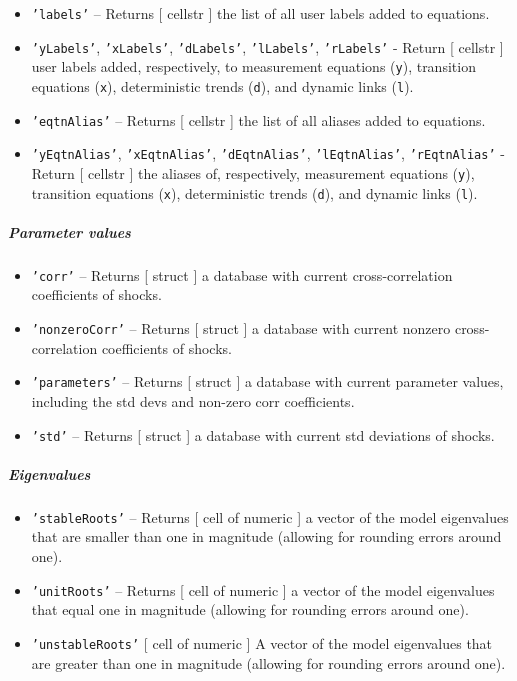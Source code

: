 \begin{itemize}
\item
  \texttt{'labels'} -- Returns {[} cellstr {]} the list of all user
  labels added to equations.
\item
  \texttt{'yLabels'}, \texttt{'xLabels'}, \texttt{'dLabels'},
  \texttt{'lLabels'}, \texttt{'rLabels'} - Return {[} cellstr {]} user
  labels added, respectively, to measurement equations (\texttt{y}),
  transition equations (\texttt{x}), deterministic trends (\texttt{d}),
  and dynamic links (\texttt{l}).
\item
  \texttt{'eqtnAlias'} -- Returns {[} cellstr {]} the list of all
  aliases added to equations.
\item
  \texttt{'yEqtnAlias'}, \texttt{'xEqtnAlias'}, \texttt{'dEqtnAlias'},
  \texttt{'lEqtnAlias'}, \texttt{'rEqtnAlias'} - Return {[} cellstr {]}
  the aliases of, respectively, measurement equations (\texttt{y}),
  transition equations (\texttt{x}), deterministic trends (\texttt{d}),
  and dynamic links (\texttt{l}).
\end{itemize}

\subparagraph{Parameter values}

\begin{itemize}
\item
  \texttt{'corr'} -- Returns {[} struct {]} a database with current
  cross-correlation coefficients of shocks.
\item
  \texttt{'nonzeroCorr'} -- Returns {[} struct {]} a database with
  current nonzero cross-correlation coefficients of shocks.
\item
  \texttt{'parameters'} -- Returns {[} struct {]} a database with
  current parameter values, including the std devs and non-zero corr
  coefficients.
\item
  \texttt{'std'} -- Returns {[} struct {]} a database with current std
  deviations of shocks.
\end{itemize}

\subparagraph{Eigenvalues}

\begin{itemize}
\item
  \texttt{'stableRoots'} -- Returns {[} cell of numeric {]} a vector of
  the model eigenvalues that are smaller than one in magnitude (allowing
  for rounding errors around one).
\item
  \texttt{'unitRoots'} -- Returns {[} cell of numeric {]} a vector of
  the model eigenvalues that equal one in magnitude (allowing for
  rounding errors around one).
\item
  \texttt{'unstableRoots'} {[} cell of numeric {]} A vector of the model
  eigenvalues that are greater than one in magnitude (allowing for
  rounding errors around one).
\end{itemize}

